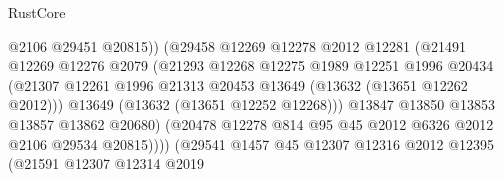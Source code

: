 \begin{lexlean}{RustCore}
\begin{coremodule}
                                        @2106
                                        @29451
                                        @20815))
                                    (@29458
                                      @12269
                                      @12278
                                      @2012
                                      @12281
                                      (@21491
                                        @12269
                                        @12276
                                        @2079
                                        (@21293
                                          @12268
                                          @12275
                                          @1989
                                          @12251
                                          @1996
                                          @20434
                                          (@21307
                                            @12261
                                            @1996
                                            @21313
                                            @20453
                                            @13649
                                            (@13632 (@13651 @12262 @2012)))
                                          @13649
                                          (@13632 (@13651 @12252 @12268)))
                                        @13847
                                        @13850
                                        @13853
                                        @13857
                                        @13862
                                        @20680)
                                      (@20478
                                        @12278
                                        @814
                                        @95
                                        @45
                                        @2012
                                        @6326
                                        @2012
                                        @2106
                                        @29534
                                        @20815))))
                                (@29541
                                  @1457
                                  @45
                                  @12307
                                  @12316
                                  @2012
                                  @12395
                                  (@21591
                                    @12307
                                    @12314
                                    @2019

\end{coremodule}
\end{lexlean}
